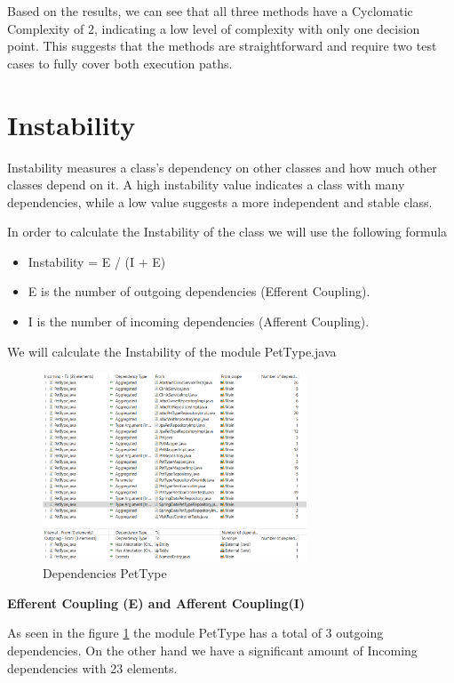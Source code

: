 \documentclass[a4paper,11pt,openright,BCOR=15mm]{scrbook}
\begin{document}
  Based on the results, we can see that all three methods have a Cyclomatic Complexity of 2, indicating a low level of complexity with only one decision point. This suggests that the methods are straightforward and require two test cases to fully cover both execution paths.


  \section{Instability}

Instability measures a class's dependency on other classes and how much other classes depend on it. A high instability value indicates a class with many dependencies, while a low value suggests a more independent and stable class.

In order to calculate the Instability of the class we will use the following formula
\begin{itemize}
	\item Instability = E / (I + E)
	\item E is the number of outgoing dependencies (Efferent Coupling).
	\item I is the number of incoming dependencies (Afferent Coupling).
\end{itemize}
We will calculate the Instability of the module PetType.java 

\begin{figure}[H]
	\centering
	\includegraphics[width=0.7\textwidth]{figs/Maintainability/DependenciesPetType.png}
	\caption{Dependencies PetType}
	\label{fig:DependenciesPetType}
  \end{figure}

\textbf{Efferent Coupling (E) and Afferent Coupling(I)}


As seen in the figure \ref{fig:DependenciesPetType} the module PetType has a total of 3 outgoing dependencies. On the other hand we have a significant amount of Incoming dependencies with 23 elements. 
\end{document}
